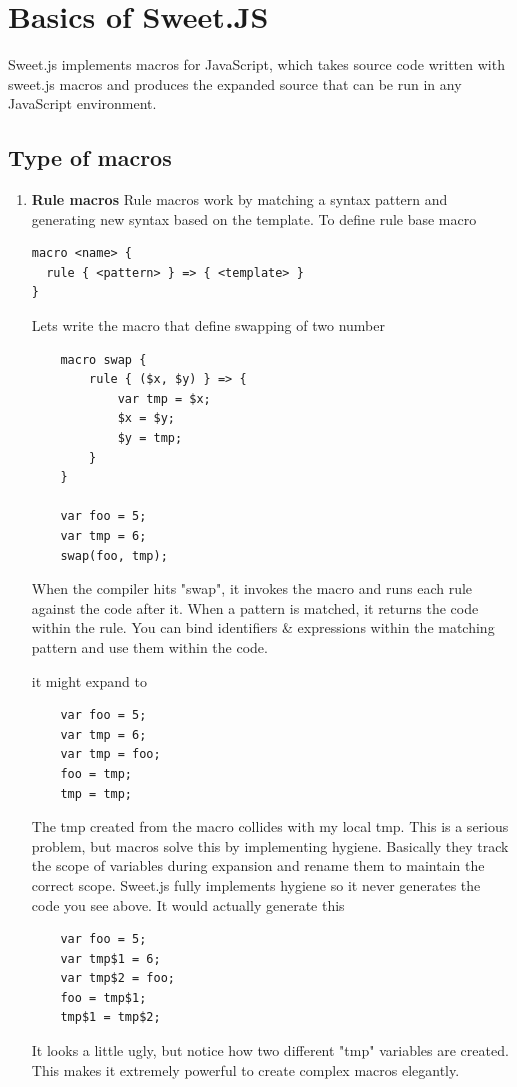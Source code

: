 \chapter{Basics of Sweet.JS}

Sweet.js implements macros for JavaScript, which takes source code written with sweet.js macros and produces the expanded source that can be run in any JavaScript environment. 
\section{Type of macros}
\begin{enumerate}
\item {\bf Rule macros }
Rule macros work by matching a syntax pattern and generating new syntax based on the template.
To define rule base macro
\begin{lstlisting}
macro <name> {
  rule { <pattern> } => { <template> }
}
\end{lstlisting} 

Lets write the macro that define swapping of two number
\begin{lstlisting}
	macro swap {
    	rule { ($x, $y) } => {
        	var tmp = $x;
        	$x = $y;
        	$y = tmp;
    	}
	}

	var foo = 5;
	var tmp = 6;
	swap(foo, tmp);
\end{lstlisting} 

When the compiler hits "swap", it invokes the macro and runs each rule against the code after it. When a pattern is matched, it returns the code within the rule. You can bind identifiers \& expressions within the matching pattern and use them within the code.

it might expand to 
\begin{lstlisting}
	var foo = 5;
	var tmp = 6;
	var tmp = foo;
	foo = tmp;
	tmp = tmp;
\end{lstlisting} 
The tmp created from the macro collides with my local tmp. This is a serious problem, but macros solve this by implementing hygiene. Basically they track the scope of variables during expansion and rename them to maintain the correct scope. Sweet.js fully implements hygiene so it never generates the code you see above. It would actually generate this
\begin{lstlisting}
	var foo = 5;
	var tmp$1 = 6;
	var tmp$2 = foo;
	foo = tmp$1;
	tmp$1 = tmp$2;
\end{lstlisting} 
It looks a little ugly, but notice how two different "tmp" variables are created. This makes it extremely powerful to create complex macros elegantly.


\end{enumerate}
